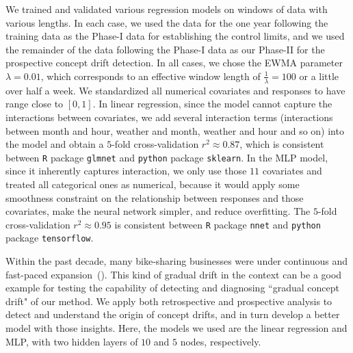 \documentclass[twoside,11pt]{article}
\begin{document}
We trained and validated various regression models on windows of data with various lengths. In each case, we used the data for the one year following the training data as the Phase-I data for establishing the control limits, and we used the remainder of the data following the Phase-I data as our Phase-II for the prospective concept drift detection. In all cases, we chose the EWMA parameter $ \lambda = 0.01$, which corresponds to an effective window length of $\frac{1}{\lambda}=100$ or a little over half a week. We standardized all numerical covariates and responses to have range close to $[0,1]$. In linear regression, since the model cannot capture the interactions between covariates, we add several interaction terms (interactions between month and hour, weather and month, weather and hour and so on) into the model and obtain a $5$-fold cross-validation $r^2\approx 0.87$, which is consistent between \texttt{R} package \texttt{glmnet} and \texttt{python} package \texttt{sklearn}. In the MLP model, since it inherently captures interaction, we only use those $11$ covariates and treated all categorical ones as numerical, because it would apply some smoothness constraint on the relationship between responses and those covariates, make the neural network simpler, and reduce overfitting. The $5$-fold cross-validation $r^2\approx 0.95$ is consistent between \texttt{R} package \texttt{nnet} and \texttt{python} package \texttt{tensorflow}.


Within the past decade, many bike-sharing businesses were under continuous and fast-paced expansion~(\cite{shaheen2012public}). This kind of gradual drift in the context can be a good example for testing the capability of detecting and diagnosing ``gradual concept drift" of our method. We apply both retrospective and prospective analysis to detect and understand the origin of concept drifts, and in turn develop a better model with those insights. Here, the models we used are the linear regression and MLP, with two hidden layers of $10$ and $5$ nodes, respectively.
\end{document}
